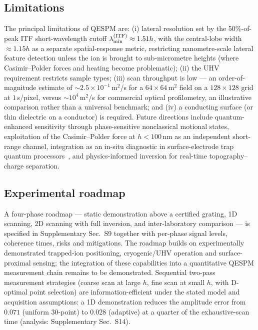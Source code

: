 \documentclass[12pt,a4paper]{article}
\begin{document}
\subsection{Limitations}

The principal limitations of QESPM are: (i) lateral resolution set by the
50\%-of-peak ITF short-wavelength cutoff
$\lambda_{\min}^{\rm(ITF)}\approx1.51h$, with the central-lobe width
$\approx1.15h$ as a separate spatial-response metric,
restricting nanometre-scale lateral feature detection unless the ion is
brought to sub-micrometre heights (where Casimir--Polder forces and
heating become problematic); (ii) the UHV requirement restricts sample
types; (iii) scan throughput is low --- an order-of-magnitude estimate of
${\sim}2.5\times10^{-1}$\,\textmu m$^2$/s for a $64\times64$\,\textmu m$^2$
field on a $128\times128$ grid at $1$\,s/pixel, versus
${\sim}10^{4}$\,\textmu m$^2$/s for commercial optical profilometry, an
illustrative comparison rather than a universal benchmark; and (iv) a
conducting surface (or thin dielectric on a conductor) is required.
Future directions include quantum-enhanced sensitivity through
phase-sensitive nonclassical motional states, exploitation of the
Casimir--Polder force at
$h<100$\,nm as an independent short-range channel, integration as an
in-situ diagnostic in surface-electrode trap quantum
processors~\cite{kumph2016operation}, and physics-informed inversion for
real-time topography--charge separation.

\subsection{Experimental roadmap}

A four-phase roadmap --- static demonstration above a certified
grating, 1D scanning, 2D scanning with full inversion, and
inter-laboratory comparison --- is specified in Supplementary Sec.~S9
together with per-phase signal levels, coherence times, risks and
mitigations.  The roadmap builds on experimentally demonstrated
trapped-ion positioning, cryogenic/UHV operation and surface-proximal
sensing; the integration of these capabilities into a quantitative
QESPM measurement chain remains to be demonstrated.  Sequential
two-pass measurement strategies (coarse scan at large $h$, fine scan at
small $h$, with D-optimal point selection) are information-efficient
under the stated model and acquisition assumptions: a 1D demonstration
reduces the amplitude error from $0.071$ (uniform 30-point) to $0.028$
(adaptive) at a quarter of the exhaustive-scan time (analysis:
Supplementary Sec.~S14).
\end{document}
